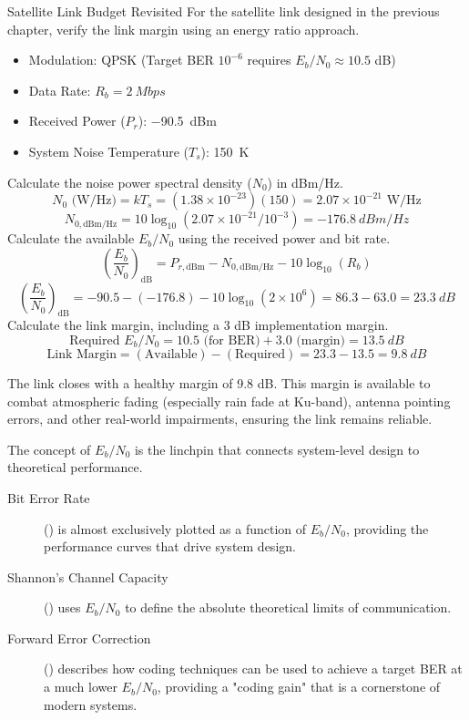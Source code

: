 \begin{workedexample}{Satellite Link Budget Revisited}
     For the satellite link designed in the previous chapter, verify the link margin using an energy ratio approach.
    \begin{itemize}
        \item Modulation: QPSK (Target BER $10^{-6}$ requires $E_b/N_0 \approx 10.5$ dB)
        \item Data Rate: $R_b = \qty{2}{Mbps}$
        \item Received Power ($P_r$): \qty{-90.5}{dBm}
        \item System Noise Temperature ($T_s$): \qty{150}{K}
    \end{itemize}
    \begin{derivationsteps}
        \step Calculate the noise power spectral density ($N_0$) in dBm/Hz.
        \[ N_0 \text{ (W/Hz)} = kT_s = (1.38 \times 10^{-23})(150) = 2.07 \times 10^{-21} \text{ W/Hz} \]
        \[ N_{0, \text{dBm/Hz}} = 10\log_{10}(2.07 \times 10^{-21} / 10^{-3}) = \qty{-176.8}{dBm/Hz} \]
        \step Calculate the available $E_b/N_0$ using the received power and bit rate.
        \[ \left(\frac{E_b}{N_0}\right)_{\text{dB}} = P_{r, \text{dBm}} - N_{0, \text{dBm/Hz}} - 10\log_{10}(R_b) \]
        \[ \left(\frac{E_b}{N_0}\right)_{\text{dB}} = -90.5 - (-176.8) - 10\log_{10}(2 \times 10^6) = 86.3 - 63.0 = \qty{23.3}{dB} \]
        \step Calculate the link margin, including a 3 dB implementation margin.
        \[ \text{Required } E_b/N_0 = 10.5 \text{ (for BER)} + 3.0 \text{ (margin)} = \qty{13.5}{dB} \]
        \[ \text{Link Margin} = (\text{Available}) - (\text{Required}) = 23.3 - 13.5 = \qty{9.8}{dB} \]
    \end{derivationsteps}
     The link closes with a healthy margin of 9.8 dB. This margin is available to combat atmospheric fading (especially rain fade at Ku-band), antenna pointing errors, and other real-world impairments, ensuring the link remains reliable.
\end{workedexample}

\begin{importantbox}[title={Further Reading}]
    The concept of $E_b/N_0$ is the linchpin that connects system-level design to theoretical performance.
    \begin{description}
        \item[Bit Error Rate] () is almost exclusively plotted as a function of $E_b/N_0$, providing the performance curves that drive system design.
        \item[Shannon's Channel Capacity] () uses $E_b/N_0$ to define the absolute theoretical limits of communication.
        \item[Forward Error Correction] () describes how coding techniques can be used to achieve a target BER at a much lower $E_b/N_0$, providing a "coding gain" that is a cornerstone of modern systems.
    \end{description}
\end{importantbox}
